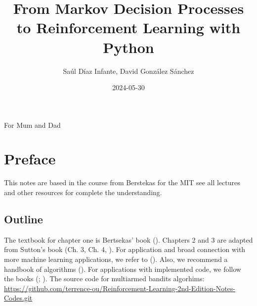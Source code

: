 \documentclass[
  letterpaper,
]{krantz}
\title{From Markov Decision Processes to Reinforcement Learning with
Python}
\author{Saúl Díaz Infante, David González Sánchez}
\date{2024-05-30}
\renewcommand*\contentsname{Table of contents}
\newcommand\contentsname{Table of contents}
\theoremstyle{plain}
\theoremstyle{definition}
\theoremstyle{definition}
\theoremstyle{remark}
\begin{document}
\maketitle


\thispagestyle{empty}

\begin{center}
For Mum and Dad
\end{center}

\setlength{\abovedisplayskip}{-5pt}
\setlength{\abovedisplayshortskip}{-5pt}



\renewcommand*\contentsname{Table of contents}
{
\hypersetup{linkcolor=}
\setcounter{tocdepth}{2}
\tableofcontents
}

\chapter{Preface}\label{preface}

This notes are based in the course from Berstekas for the MIT see all
lectures and other resources for complete the understanding.

\section{Outline}\label{outline}

The textbook for chapter one is Bertsekas' book
(). Chapters 2 and 3 are
adapted from Sutton's book (Ch. 3, Ch. 4,
). For application and
broad connection with more machine learning applications, we refer to
(). Also, we recommend
a handbook of algorithms (). For applications with implemented code, we follow the books
(;
). The source code for
multiarmed bandits algorhims:
\url{https://github.com/terrence-ou/Reinforcement-Learning-2nd-Edition-Notes-Codes.git}

\end{document}
